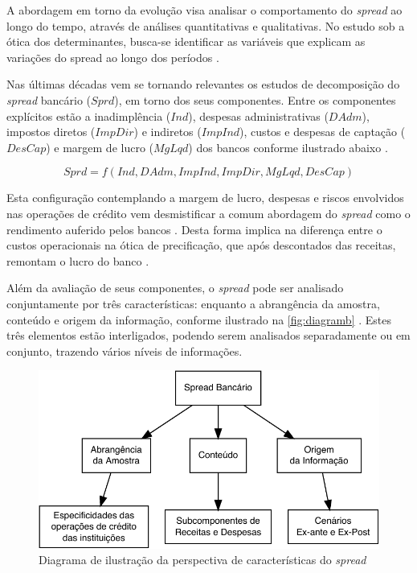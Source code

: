 \documentclass[
  12pt,
  12pt,
  openright,
  oneside,
  a4paper,
  chapter=TITLE,
  section=TITLE,
  subsection=TITLE,
  subsubsection=TITLE,
  portugues,
  sumario=tradicional]{abntex2}
\begin{document}
A abordagem em torno da evolução visa analisar o comportamento do \emph{spread} ao longo do tempo, através de análises quantitativas e qualitativas. No estudo sob a ótica dos determinantes, busca-se identificar as variáveis que explicam as variações do spread ao longo dos períodos \cite{dick:1999}.

Nas últimas décadas vem se tornando relevantes os estudos de decomposição do \emph{spread} bancário (\(Sprd\)), em torno dos seus componentes. Entre os componentes explícitos estão a inadimplência (\(Ind\)), despesas administrativas (\(DAdm\)), impostos diretos (\(ImpDir\)) e indiretos (\(ImpInd\)), custos e despesas de captação (\(DesCap\)) e margem de lucro (\(MgLqd\)) dos bancos conforme ilustrado abaixo \cite{BCB:2000, BCB:1999}.

\begin{equation}
Sprd=f(Ind, DAdm, ImpInd, ImpDir, MgLqd, DesCap)
\end{equation}

Esta configuração contemplando a margem de lucro, despesas e riscos envolvidos nas operações de crédito vem desmistificar a comum abordagem do \emph{spread} como o rendimento auferido pelos bancos \cite{costa;nakane:2004, dantas:2012}. Desta forma implica na diferença entre o custos operacionais na ótica de precificação, que após descontados das receitas, remontam o lucro do banco \cite{BCB:2016}.

Além da avaliação de seus componentes, o \emph{spread} pode ser analisado conjuntamente por três características: enquanto a abrangência da amostra, conteúdo e origem da informação, conforme ilustrado na \autoref{fig:diagramb} \cite{leal:2006}. Estes três elementos estão interligados, podendo serem analisados separadamente ou em conjunto, trazendo vários níveis de informações.

\begin{figure}[!hbtp]
\vspace{20pt}
\caption{Diagrama de ilustração da perspectiva de características do \emph{spread}}
\vspace{-4mm}

\begin{center}\includegraphics{12-exportedfigures/diagram.spread.carac-1} \end{center}
\vspace{-3mm}
\label{fig:diagramb}
\vspace{-2mm}
\end{figure}
\end{document}
